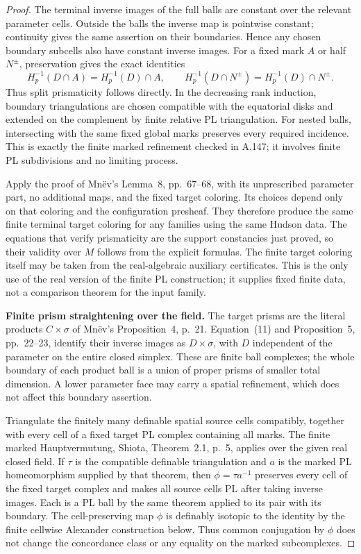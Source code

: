 \begin{proof}
The terminal inverse images of the full balls are constant
over the relevant parameter cells. Outside the balls the
inverse map is pointwise constant; continuity gives the same
assertion on their boundaries. Hence any chosen boundary
subcells also have constant inverse images. For a fixed
mark $A$ or half $N^{\pm}$, preservation gives the exact
identities
\[
 H_p^{-1}(D\cap A)=H_p^{-1}(D)\cap A,\qquad
 H_p^{-1}(D\cap N^{\pm})=H_p^{-1}(D)\cap N^{\pm}.
 \tag{159.5}
\]
Thus split prismaticity follows directly. In the decreasing
rank induction, boundary triangulations are chosen compatible
with the equatorial disks and extended on the complement by
finite relative PL triangulation. For nested balls, intersecting
with the same fixed global marks preserves every required
incidence. This is exactly the finite marked refinement checked
in A.147; it involves finite PL subdivisions and no limiting
process.

Apply the proof of Mn\"ev's Lemma~8, pp.~67--68, with its
unprescribed parameter part, no additional maps, and the
fixed target coloring. Its choices depend only on that coloring
and the configuration presheaf. They therefore produce the
same finite terminal target coloring for any families using
the same Hudson data. The equations that verify prismaticity
are the support constancies just proved, so their validity
over $M$ follows from the explicit formulas. The finite target
coloring itself may be taken from the real-algebraic auxiliary
certificates. This is the only use of the real version of the
finite PL construction; it supplies fixed finite data, not a
comparison theorem for the input family.

\textbf{Finite prism straightening over the field.}\quad
The target prisms are the literal products $C\times\sigma$
of Mn\"ev's Proposition~4, p.~21. Equation~(11) and
Proposition~5, pp.~22--23, identify their inverse images as
$D\times\sigma$, with $D$ independent of the parameter on
the entire closed simplex. These are finite ball complexes;
the whole boundary of each product ball is a union of proper
prisms of smaller total dimension. A lower parameter face
may carry a spatial refinement, which does not affect this
boundary assertion.

Triangulate the finitely many definable spatial source cells
compatibly, together with every cell of a fixed target PL
complex containing all marks. The finite marked
Hauptvermutung, Shiota, Theorem~2.1, p.~5, applies over the
given real closed field. If $\tau$ is the compatible definable
triangulation and $a$ is the marked PL homeomorphism supplied
by that theorem, then $\phi=\tau a^{-1}$ preserves every
cell of the fixed target complex and makes all source cells
PL after taking inverse images. Each is a PL ball by the
same theorem applied to its pair with its boundary.
The cell-preserving map $\phi$ is definably isotopic to the
identity by the finite cellwise Alexander construction below.
Thus common conjugation by $\phi$ does not change the
concordance class or any equality on the marked subcomplexes.


\end{proof}
